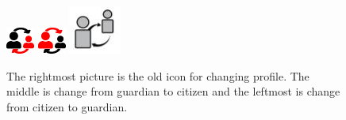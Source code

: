 \begin{figure}[htp]

    \centering
    \includegraphics[width=.1\textwidth]{figures/changeToGuardian}\hfill
    \includegraphics[width=.1\textwidth]{figures/changeToCitizen}\hfill
    \includegraphics[width=.1\textwidth]{figures/old-change-profile}
    
    \caption{The rightmost picture is the old icon for changing profile. The middle is change from guardian to citizen and the leftmost is change from citizen to guardian.}
    \label{fig:change-profile-icons}
\end{figure}


